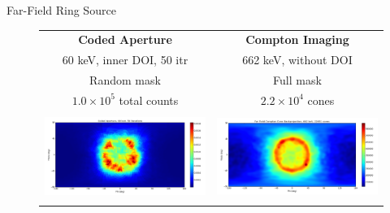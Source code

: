 \documentclass[xcolor=x11names,compress]{beamer}
\renewcommand{\(}{\begin{columns}}
\renewcommand{\)}{\end{columns}}
\newcommand{\<}[1]{\begin{column}{#1}}
\renewcommand{\>}{\end{column}}
\begin{document}
\begin{frame}{Far-Field Ring Source}

\vspace{-2ex}
\begin{figure}
\begin{tabular}{cc}
	\textbf{Coded Aperture} & \textbf{Compton Imaging} \\
	60 keV, inner DOI, 50 itr & 662 keV, without DOI \\
	Random mask & Full mask \\
	$1.0\times10^5$ total counts & $2.2 \times10^4$ cones \\
	\includegraphics[height=80pt, width=160pt]{Figures/FarfieldRing_60_DOI.png} & 
	\includegraphics[height=80pt, width=160pt]{Figures/FarfieldRing_662.png} \\
\end{tabular}
\end{figure}

\end{frame}
\end{document}
